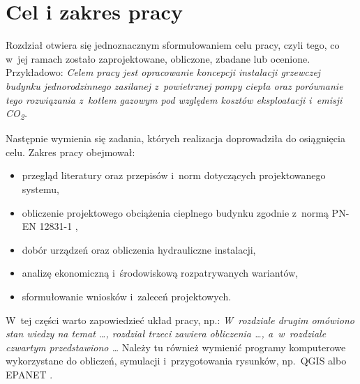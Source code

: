 \chapter{Cel i zakres pracy}
\label{chap:cel}


Rozdział otwiera się jednoznacznym sformułowaniem celu pracy, czyli tego, co
w~jej ramach zostało zaprojektowane, obliczone, zbadane lub ocenione.
Przykładowo: \emph{Celem pracy jest opracowanie koncepcji instalacji
grzewczej budynku jednorodzinnego zasilanej z~powietrznej pompy ciepła oraz
porównanie tego rozwiązania z~kotłem gazowym pod względem kosztów
eksploatacji i~emisji CO\textsubscript{2}.}

Następnie wymienia się zadania, których realizacja doprowadziła do
osiągnięcia celu. Zakres pracy obejmował:
\begin{itemize}
  \item przegląd literatury oraz przepisów i~norm dotyczących
        projektowanego systemu,
  \item obliczenie projektowego obciążenia cieplnego budynku zgodnie
        z~normą PN-EN 12831-1 \cite{pn12831},
  \item dobór urządzeń oraz obliczenia hydrauliczne instalacji,
  \item analizę ekonomiczną i~środowiskową rozpatrywanych wariantów,
  \item sformułowanie wniosków i~zaleceń projektowych.
\end{itemize}

W~tej części warto zapowiedzieć układ pracy, np.: \emph{W~rozdziale drugim
omówiono stan wiedzy na temat \dots, rozdział trzeci zawiera obliczenia
\dots, a~w~rozdziale czwartym przedstawiono \dots} Należy tu również
wymienić programy komputerowe wykorzystane do obliczeń, symulacji
i~przygotowania rysunków, np.\ QGIS \cite{qgis} albo EPANET \cite{epanet22}.
